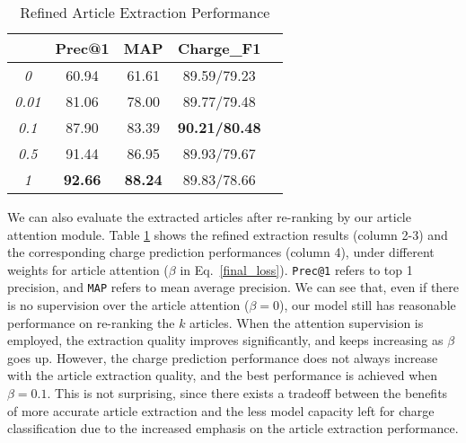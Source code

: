 \begin{table}
\centering
\normalsize{
\begin{tabular}{|c|c|c|c|c|}
\hline
\bm{$\beta$}							& \textbf{Prec@1} 		& \textbf{MAP} 			& \textbf{Charge\_F1} \\
\hline
\textit{0} 								& 60.94								& 61.61 						& 89.59/79.23 	\\
\hline
\textit{0.01} 						& 81.06								& 78.00							& 89.77/79.48 	\\
\hline
\textit{0.1} 							& 87.90								& 83.39							& \textbf{90.21/80.48} 	\\
\hline
\textit{0.5} 							& 91.44								& 86.95							& 89.93/79.67 	\\
\hline
\textit{1} 								& \textbf{92.66}			& \textbf{88.24}		& 89.83/78.66 	\\
\hline
\end{tabular}
}
\caption{Refined Article Extraction Performance}
\label{tab_article_att}
\end{table}


We can also evaluate the extracted articles after re-ranking by our article attention module.
Table \ref{tab_article_att} shows the refined extraction results  (column 2-3) and the corresponding charge prediction performances (column 4), under different weights for article attention ($\beta$ in Eq.~\ref{final_loss}). \texttt{Prec@1} refers to top 1 precision, and \texttt{MAP} refers to mean average precision.
%
We can see that, even if there is no supervision over the article attention ($\beta=0$), our model still has reasonable performance on re-ranking the $k$ articles. When the attention supervision is employed, the extraction quality improves significantly, and keeps increasing as $\beta$ goes up.
However, the charge prediction performance does not always increase with the article extraction quality, and the best performance is achieved when $\beta=0.1$. This is not surprising, since  there exists a tradeoff between the benefits of more accurate article extraction and the less model capacity left for charge classification due to the increased emphasis on the article extraction performance.

